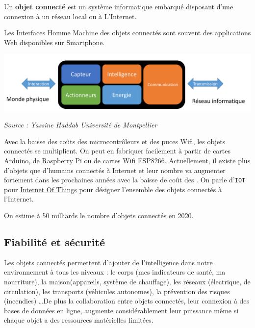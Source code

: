 \begin{definition}{}
Un \textbf{objet connecté} est un système informatique embarqué disposant d'une connexion à un réseau local ou à L'Internet. 

Les Interfaces Homme Machine des objets connectés sont souvent des applications Web disponibles sur Smartphone.


\end{definition}




\begin{center}
\includegraphics[scale=0.4]{objet-connecte.png}

{\itshape \small Source : Yassine Haddab Université de Montpellier}
\end{center}

Avec la baisse des coûts des microcontrôleurs et des puces Wifi, les objets connectés se multiplient. On peut en fabriquer facilement à partir de cartes Arduino, de Raspberry Pi ou de cartes Wifi ESP8266.
Actuellement, il existe plus d'objets que d'humains connectés à Internet et leur nombre va augmenter fortement dans les prochaines années avec la baisse de coût des . On parle d'\texttt{IOT} pour \href{https://fr.wikipedia.org/wiki/Internet_des_objets}{Internet Of Things} pour désigner l'ensemble des objets connectés à l'Internet.

On estime à 50 milliards le nombre d’objets connectés en 2020.


\subsection{Fiabilité et sécurité}

Les objets connectés permettent d'ajouter de l'intelligence dans notre environnement à tous les niveaux : le corps (mes indicateurs de santé, ma nourriture), la maison(appareils, système de chauffage), les réseaux (électrique, de circulation), les transports (véhicules autonomes), la prévention des risques (incendies) \ldots De plus la collaboration entre objets connectés, leur connexion à des bases de données en ligne, augmente considérablement leur puissance même si chaque objet a des ressources matérielles limitées.

